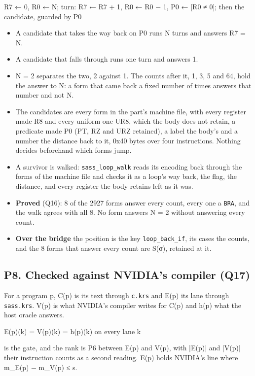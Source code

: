 R7 ← 0, R0 ← N;  turn: R7 ← R7 + 1, R0 ← R0 − 1, P0 ← [R0 ≠ 0];  then the candidate, guarded by P0

\begin{itemize}
\item A candidate that takes the way back on P0 runs N turns and answers R7 = N.
\item A candidate that falls through runs one turn and answers 1.
\item N = 2 separates the two, 2 against 1. The counts after it, 1, 3, 5 and 64, hold the answer to N: a form that came back a fixed number of times answers that number and not N.
\item The candidates are every form in the part's machine file, with every register made R8 and every uniform one UR8, which the body does not retain, a predicate made P0 (PT, RZ and URZ retained), a label the body's and a number the distance back to it, 0x40 bytes over four instructions. Nothing decides beforehand which forms jump.
\item A survivor is walked: \texttt{sass\_\allowbreak{}loop\_\allowbreak{}walk} reads its encoding back through the forms of the machine file and checks it as a loop's way back, the flag, the distance, and every register the body retains left as it was.
\item \textbf{Proved} (Q16): 8 of the 2927 forms answer every count, every one a \texttt{BRA}, and the walk agrees with all 8. No form answers N = 2 without answering every count.
\item \textbf{Over the bridge} the position is the key \texttt{loop\_\allowbreak{}back\_\allowbreak{}if}, its cases the counts, and the 8 forms that answer every count are S(σ), retained at it.
\end{itemize}

\subsection{\texorpdfstring{P8. Checked against NVIDIA's compiler (Q17)}{P8. Checked against NVIDIA's compiler (Q17)}}

For a program p, C(p) is its text through \texttt{c.\allowbreak{}krs} and E(p) its lane through \texttt{sass.\allowbreak{}krs}. V(p) is what NVIDIA's compiler writes for C(p) and h(p) what the host oracle answers.

E(p)(k) = V(p)(k) = h(p)(k) on every lane k

is the gate, and the rank is P6 between E(p) and V(p), with |E(p)| and |V(p)| their instruction counts as a second reading. E(p) holds NVIDIA's line where m\_\allowbreak{}E(p) − m\_\allowbreak{}V(p) ≤ s.

